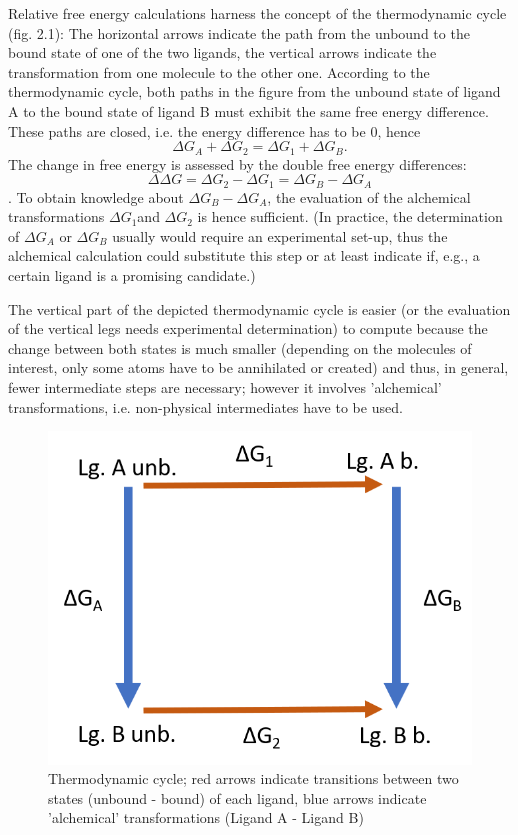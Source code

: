 Relative free energy calculations harness the concept of the thermodynamic
cycle \cite{Kollman.}(fig. 2.1): The horizontal arrows indicate the
path from the unbound to the bound state of one of the two ligands,
the vertical arrows indicate the transformation from one molecule
to the other one. According to the thermodynamic cycle, both paths
in the figure from the unbound state of ligand A to the bound state
of ligand B must exhibit the same free energy difference. These paths
are closed, i.e. the energy difference has to be 0, hence 
\[
\Delta G_{A}+\Delta G_{2}=\Delta G_{1}+\Delta G_{B}.
\]
 The change in free energy is assessed by the double free energy differences:
\[
\Delta\Delta G=\Delta G_{2}-\Delta G_{1}=\Delta G_{B}-\Delta G_{A}
\]
\cite{Cournia.2017}. To obtain knowledge about $\Delta G_{B}-\Delta G_{A}$,
the evaluation of the alchemical transformations $\Delta G_{1}$and
$\Delta G_{2}$ is hence sufficient. (In practice, the determination
of $\Delta G_{A}$ or $\Delta G_{B}$ usually would require an experimental
set-up, thus the alchemical calculation could substitute this step
or at least indicate if, e.g., a certain ligand is a promising candidate.)

The vertical part of the depicted thermodynamic cycle is easier (or
the evaluation of the vertical legs needs experimental determination)
to compute because the change between both states is much smaller
(depending on the molecules of interest, only some atoms have to be
annihilated or created) and thus, in general, fewer intermediate steps
are necessary; however it involves 'alchemical' transformations, i.e.
non-physical intermediates have to be used. 
\begin{figure}
\includegraphics[scale=0.8]{cycle1}\caption{Thermodynamic cycle; red arrows indicate transitions between two states
(unbound - bound) of each ligand, blue arrows indicate 'alchemical'
transformations (Ligand A - Ligand B)}

\end{figure}

